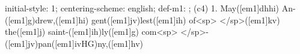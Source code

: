 initial-style: 1;
centering-scheme: english;
def-m1: \grealign;
(c4) 1. May([em1]dhhi) An-([em1]g)drew,([em1]hi) gent([em1]jv)lest([em1]ih) of<sp>   </sp>([em1]kv) the([em1]j) saint-([em1]ih)ly([em1]g) com<sp> </sp>-([em1]jv)pan([em1]ivHG)ny,([em1]hv)